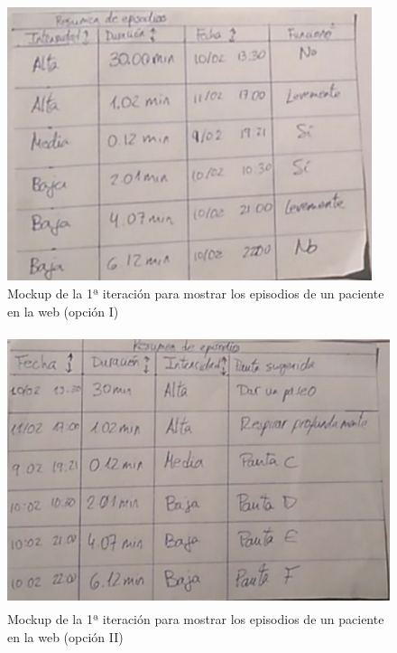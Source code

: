 \begin{figure}[H]
    \centering
    \includegraphics[width=0.7\linewidth, height=8cm]{Imagenes/04DescProblema/mockups/v1/web/06-resumenEpisodios.png}
    \caption[Mockup de la 1ª iteración para mostrar los episodios de un paciente en la web (opción I)]{Mockup de la 1ª iteración para mostrar los episodios de un paciente en la web (opción I)}
    \label{c4:fig:v1:web:tablaEpisodios}
\end{figure}

\begin{figure}[H]
    \centering
    \includegraphics[width=0.7\linewidth, height=8cm]{Imagenes/04DescProblema/mockups/v1/web/06-resumenEpisodios-2.png}
    \caption[Mockup de la 1ª iteración para mostrar los episodios de un paciente en la web (opción II)]{Mockup de la 1ª iteración para mostrar los episodios de un paciente en la web (opción II)}
    \label{c4:fig:v1:web:tablaEpisodios2}
\end{figure}

